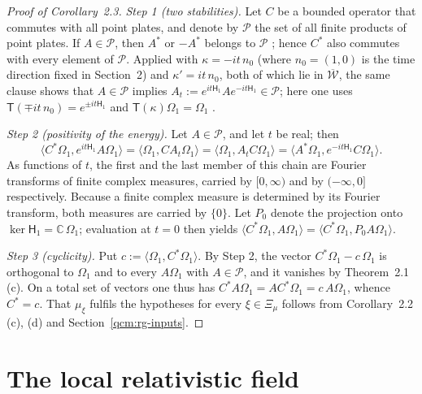 \documentclass[11pt,letterpaper,reqno]{amsart}
\theoremstyle{definition}
\begin{document}
\begin{proof}[Proof of Corollary~2.3]
\emph{Step 1 (two stabilities).}
Let $C$ be a bounded operator that commutes with all point plates, and denote by $\mathcal P$ the set of all finite products of point plates.
If $A\in\mathcal P$, then $A^*$ or $-A^*$ belongs to $\mathcal P$ \cite[Proposition~8.2 and Section~8.3]{QEDConstruction}; hence $C^*$ also commutes with every element of $\mathcal P$.
Applied with $\kappa=-it\,n_0$ (where $n_0=(1,0)$ is the time direction fixed in Section~2) and $\kappa'=it\,n_0$, both of which lie in $\overline{\mathcal W}$, the same clause shows that $A\in\mathcal P$ implies $A_t:=e^{it\mathsf H_1}Ae^{-it\mathsf H_1}\in\mathcal P$; here one uses $\mathsf T(\mp it\,n_0)=e^{\pm it\mathsf H_1}$ and $\mathsf T(\kappa)\Omega_1=\Omega_1$ \cite[Proposition~8.2 and Section~8.3]{QEDConstruction}.

\emph{Step 2 (positivity of the energy).}
Let $A\in\mathcal P$, and let $t$ be real; then
\begin{equation*}
\langle C^*\Omega_1,e^{it\mathsf H_1}A\Omega_1\rangle=\langle\Omega_1,CA_t\Omega_1\rangle=\langle\Omega_1,A_tC\Omega_1\rangle=\langle A^*\Omega_1,e^{-it\mathsf H_1}C\Omega_1\rangle.
\end{equation*}
As functions of $t$, the first and the last member of this chain are Fourier transforms of finite complex measures, carried by $[0,\infty)$ and by $(-\infty,0]$ respectively.
Because a finite complex measure is determined by its Fourier transform, both measures are carried by $\{0\}$.
Let $P_0$ denote the projection onto $\ker\mathsf H_1=\mathbb C\,\Omega_1$; evaluation at $t=0$ then yields $\langle C^*\Omega_1,\allowbreak A\Omega_1\rangle=\allowbreak \langle C^*\Omega_1,\allowbreak P_0A\Omega_1\rangle$.

\emph{Step 3 (cyclicity).}
Put $c:=\langle\Omega_1,C^*\Omega_1\rangle$.
By Step 2, the vector $C^*\Omega_1-c\,\Omega_1$ is orthogonal to $\Omega_1$ and to every $A\Omega_1$ with $A\in\mathcal P$, and it vanishes by Theorem~2.1\,(c).
On a total set of vectors one thus has $C^*A\Omega_1=AC^*\Omega_1=c\,A\Omega_1$, whence $C^*=c$.
That $\mu_\xi$ fulfils the hypotheses for every $\xi\in\Xi_\mu$ follows from Corollary~2.2\,(c), (d) and Section~\ref{qcm:rg-inputs}.
\end{proof}


\section{The local relativistic field}
\end{document}
